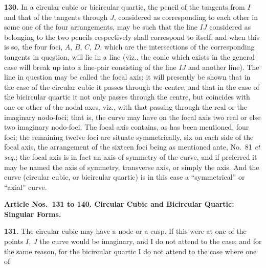 \documentclass[12pt,a4paper]{article}
\theoremstyle{definition}
\begin{document}
\vspace{0.3em}
\noindent\textbf{130.} In a circular cubic or bicircular quartic, the pencil of the tangents from
$I$ and that of the tangents through $J$, considered as corresponding to each other in
some one of the four arrangements, may be such that the line $IJ$ considered as
belonging to the two pencils respectively shall correspond to itself, and when this is
so, the four foci, $A$, $B$, $C$, $D$, which are the intersections of the corresponding tangents
in question, will lie in a line (viz., the conic which exists in the general case will
break up into a line-pair consisting of the line $IJ$ and another line). The line in
question may be called the focal axis; it will presently be shown that in the case of
the circular cubic it passes through the centre, and that in the case of the bicircular
quartic it not only passes through the centre, but coincides with one or other of the
nodal axes, viz., with that passing through the real or the imaginary nodo-foci; that
is, the curve may have on the focal axis two real or else two imaginary nodo-foci.
The focal axis contains, as has been mentioned, four foci; the remaining twelve foci
are situate symmetrically, six on each side of the focal axis, the arrangement of the
sixteen foci being as mentioned ante, No.~81 \textit{et seq.}; the focal axis is in fact an
axis of symmetry of the curve, and if preferred it may be named the axis of symmetry,
transverse axis, or simply the axis. And the curve (circular cubic, or bicircular quartic)
is in this case a ``symmetrical'' or ``axial'' curve.

\vspace{0.5em}
\noindent\textbf{Article Nos.~131 to 140. Circular Cubic and Bicircular Quartic: Singular Forms.}

\vspace{0.3em}
\noindent\textbf{131.} The circular cubic may have a node or a cusp. If this were at one of the
points $I$, $J$ the curve would be imaginary, and I do not attend to the case; and for
the same reason, for the bicircular quartic I do not attend to the case where one of
\end{document}
